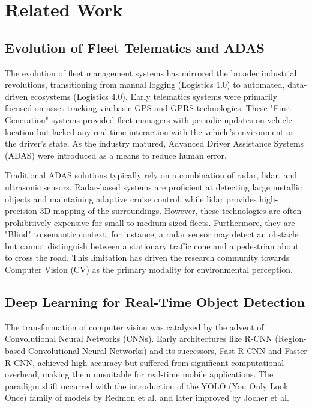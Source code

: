 \documentclass[conference]{IEEEtran}
\begin{document}
\section{Related Work}

\subsection{Evolution of Fleet Telematics and ADAS}
The evolution of fleet management systems has mirrored the broader industrial revolutions, transitioning from manual logging (Logistics 1.0) to automated, data-driven ecosystems (Logistics 4.0). Early telematics systems were primarily focused on asset tracking via basic GPS and GPRS technologies. These "First-Generation" systems provided fleet managers with periodic updates on vehicle location but lacked any real-time interaction with the vehicle's environment or the driver's state. As the industry matured, Advanced Driver Assistance Systems (ADAS) were introduced as a means to reduce human error.

Traditional ADAS solutions typically rely on a combination of radar, lidar, and ultrasonic sensors. Radar-based systems are proficient at detecting large metallic objects and maintaining adaptive cruise control, while lidar provides high-precision 3D mapping of the surroundings. However, these technologies are often prohibitively expensive for small to medium-sized fleets. Furthermore, they are "Blind" to semantic context; for instance, a radar sensor may detect an obstacle but cannot distinguish between a stationary traffic cone and a pedestrian about to cross the road. This limitation has driven the research community towards Computer Vision (CV) as the primary modality for environmental perception.

\subsection{Deep Learning for Real-Time Object Detection}
The transformation of computer vision was catalyzed by the advent of Convolutional Neural Networks (CNNs). Early architectures like R-CNN (Region-based Convolutional Neural Networks) and its successors, Fast R-CNN and Faster R-CNN, achieved high accuracy but suffered from significant computational overhead, making them unsuitable for real-time mobile applications. The paradigm shift occurred with the introduction of the YOLO (You Only Look Once) family of models by Redmon et al. and later improved by Jocher et al.
\end{document}
